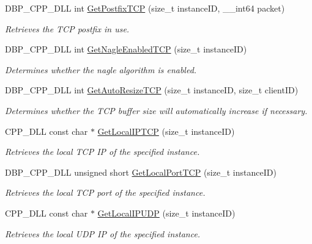 \begin{DoxyCompactItemize}
DBP\_\-CPP\_\-DLL int \hyperlink{namespacemn_a045102b8bf3bad5643f32b747f63b3ca}{GetPostfixTCP} (size\_\-t instanceID, \_\-\_\-int64 packet)
\begin{DoxyCompactList}\small\item\em Retrieves the TCP postfix in use. \item\end{DoxyCompactList}\item 
DBP\_\-CPP\_\-DLL int \hyperlink{namespacemn_aedb6bc9412d06ec6d088175141793497}{GetNagleEnabledTCP} (size\_\-t instanceID)
\begin{DoxyCompactList}\small\item\em Determines whether the nagle algorithm is enabled. \item\end{DoxyCompactList}\item 
DBP\_\-CPP\_\-DLL int \hyperlink{namespacemn_af599d054cbe64887252f1c6ef73b2bb2}{GetAutoResizeTCP} (size\_\-t instanceID, size\_\-t clientID)
\begin{DoxyCompactList}\small\item\em Determines whether the TCP buffer size will automatically increase if necessary. \item\end{DoxyCompactList}\item 
CPP\_\-DLL const char $\ast$ \hyperlink{namespacemn_a77eed9348dab0a1ee0f9d882687ac6bc}{GetLocalIPTCP} (size\_\-t instanceID)
\begin{DoxyCompactList}\small\item\em Retrieves the local TCP IP of the specified instance. \item\end{DoxyCompactList}\item 
DBP\_\-CPP\_\-DLL unsigned short \hyperlink{namespacemn_a44e66800abe59f00297e397ea4cf7bb0}{GetLocalPortTCP} (size\_\-t instanceID)
\begin{DoxyCompactList}\small\item\em Retrieves the local TCP port of the specified instance. \item\end{DoxyCompactList}\item 
CPP\_\-DLL const char $\ast$ \hyperlink{namespacemn_a561d26c7aad0f25d9a627eea6c62e714}{GetLocalIPUDP} (size\_\-t instanceID)
\begin{DoxyCompactList}\small\item\em Retrieves the local UDP IP of the specified instance. \item\end{DoxyCompactList}\item 

\end{DoxyCompactItemize}
